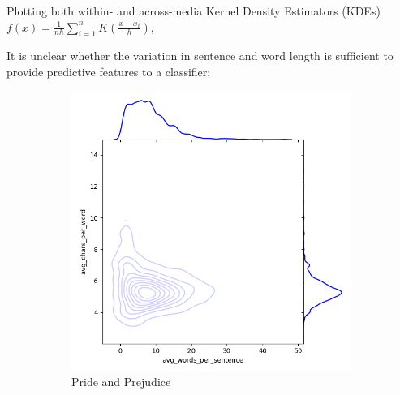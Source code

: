 \documentclass{article}
\begin{document}
\begin{titlepage}
Plotting both within- and across-media Kernel Density Estimators (KDEs) $f(x) = \frac{1}{nh} \sum_{i=1}^{n} K\left(\frac{x - x_i}{h}\right)$,

It is unclear whether the variation in sentence and word length is sufficient to provide predictive features to a classifier:

\begin{figure}[H]
    \centering
    \caption{Selected Within-Media KDE Plots}
    \begin{subfigure}[b]{0.45\textwidth}
        \centering
        \includegraphics[width=\textwidth]{images/3d_kde_test_0.png}
        \caption{Pride and Prejudice}
        \label{fig:subfig1}
    \end{subfigure}
    \hfill
    \begin{subfigure}[b]{0.45\textwidth}
        \centering

\end{subfigure}
\end{figure}
\end{titlepage}
\end{document}
